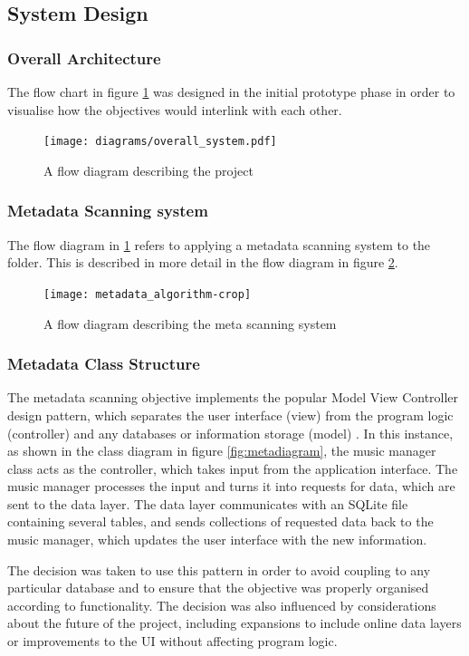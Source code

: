 \subsection{System Design}
\subsubsection{Overall Architecture}
The flow chart in figure \ref{fig:flowchart} was designed in the initial prototype phase in order to visualise how the objectives would interlink with each other.
\begin{figure}[H]
    \centering
    \texttt{[image: diagrams/overall\_system.pdf]}
    \caption{A flow diagram describing the project}
    \label{fig:flowchart}
\end{figure}

\subsubsection{Metadata Scanning system}
The flow diagram in \ref{fig:flowchart} refers to applying a metadata scanning system to the folder. This is described in more detail in the flow diagram in figure \ref{fig:meta}. 
\begin{figure}[H]
    \centering
    \texttt{[image: metadata\_algorithm-crop]}
    \caption{A flow diagram describing the meta scanning system}
    \label{fig:meta}
\end{figure}
\subsubsection{Metadata Class Structure}
The metadata scanning objective implements the popular Model View Controller design pattern, which separates the user interface (view) from the program logic (controller) and any databases or information storage (model) \parencite{mvc}.
In this instance, as shown in the class diagram in figure \ref{fig:metadiagram}, the music manager class acts as the controller, which takes input from the application interface. The music manager processes the input and turns it into requests for data, which are sent to the data layer. The data layer communicates with an SQLite file containing several tables, and sends collections of requested data back to the music manager, which updates the user interface with the new information.

The decision was taken to use this pattern in order to avoid coupling to any particular database and to ensure that the objective was properly organised according to functionality. The decision was also influenced by considerations about the future of the project, including expansions to include online data layers or improvements to the UI without affecting program logic.


